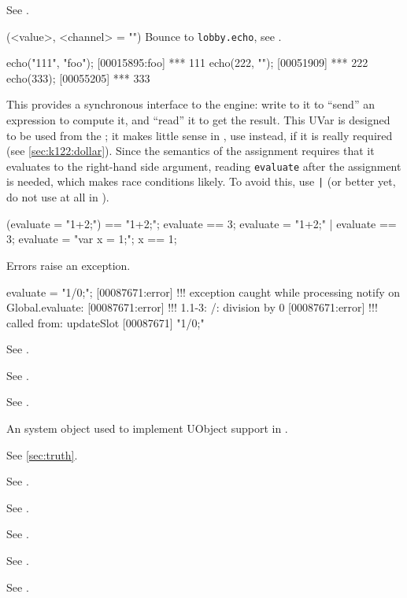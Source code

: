 \begin{urbiscriptapi}
\item[Duration] See .

\item[echo](<value>, <channel> = "")%
  Bounce to \lstinline|lobby.echo|, see .
\begin{urbiscript}
echo("111", "foo");
[00015895:foo] *** 111
echo(222, "");
[00051909] *** 222
echo(333);
[00055205] *** 333
\end{urbiscript}

\item[evaluate] This  provides a synchronous interface
  to the \urbi engine: write to it to ``send'' an expression to
  compute it, and ``read'' it to get the result.  This UVar is
  designed to be used from the \Cxx; it makes little sense in \us, use
   instead, if it is really required (see
  \autoref{sec:k122:dollar}).  Since the semantics of the assignment
  requires that it evaluates to the right-hand side argument, reading
  \lstinline|evaluate| after the assignment is needed, which makes
  race conditions likely.  To avoid this, use \lstinline{|} (or better
  yet, do not use  at all in \us).

\begin{urbiassert}
(evaluate = "1+2;") == "1+2;";
 evaluate == 3;
{ evaluate = "1+2;" | evaluate } == 3;
{ evaluate = "var x = 1;"; x } == 1;
\end{urbiassert}

  Errors raise an exception.

\begin{urbiscript}
evaluate = "1/0;";
[00087671:error] !!! exception caught while processing notify on Global.evaluate:
[00087671:error] !!! 1.1-3: /: division by 0
[00087671:error] !!!    called from: updateSlot
[00087671] "1/0;"
\end{urbiscript}

\item[Event] See .
\item[Exception] See .
\item[Executable] See .
\item[external] An system object used to implement UObject support in
  \us.
\item[false]  See \autoref{sec:truth}.
\item[File] See .
\item[Finalizable] See .
\item[Float] See .
\item[FormatInfo] See .
\item[Formatter] See .


\end{urbiscriptapi}
